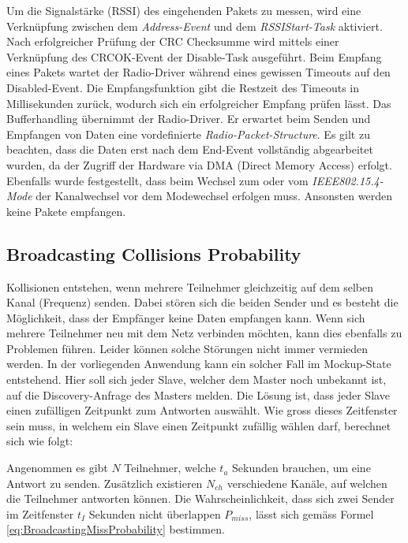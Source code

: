 Um die Signalstärke (RSSI) des eingehenden Pakets zu messen, wird eine Verknüpfung zwischen dem \textit{Address-Event} und dem \textit{RSSIStart-Task} aktiviert.
Nach erfolgreicher Prüfung der CRC Checksumme wird mittels einer Verknüpfung des CRCOK-Event der Disable-Task ausgeführt.
Beim Empfang eines Pakets wartet der Radio-Driver während eines gewissen Timeouts auf den Disabled-Event.
Die Empfangsfunktion gibt die Restzeit des Timeouts in Millisekunden zurück, wodurch sich ein erfolgreicher Empfang prüfen lässt.
Das Bufferhandling übernimmt der Radio-Driver. Er erwartet beim Senden und Empfangen von Daten eine vordefinierte \textit{Radio-Packet-Structure}.
Es gilt zu beachten, dass die Daten erst nach dem End-Event  vollständig abgearbeitet wurden, da der Zugriff der Hardware via DMA (Direct Memory Access) erfolgt.
Ebenfalls wurde festgestellt, dass beim Wechsel zum oder vom  \textit{IEEE802.15.4-Mode} der Kanalwechsel vor dem Modewechsel erfolgen muss. Ansonsten werden keine Pakete empfangen. \cite{nordic_semi_nrf_infocenter_radio_receive_sequence_2020}


\subsection{Broadcasting Collisions Probability}\label{sec:BroadcastingCollissionsProbability}

Kollisionen entstehen, wenn mehrere Teilnehmer gleichzeitig auf dem selben Kanal (Frequenz) senden.
Dabei stören sich die beiden Sender und es besteht die Möglichkeit, dass der Empfänger keine Daten empfangen kann.
Wenn sich mehrere Teilnehmer neu mit dem Netz verbinden möchten, kann dies ebenfalls zu Problemen führen.
Leider können solche Störungen nicht immer vermieden werden.
In der vorliegenden Anwendung kann ein solcher Fall im Mockup-State entstehend.
Hier soll sich jeder Slave, welcher dem Master noch unbekannt ist, auf die Discovery-Anfrage des Masters melden.
Die Lösung ist, dass jeder Slave einen zufälligen Zeitpunkt zum Antworten auswählt.
Wie gross dieses Zeitfenster sein muss, in welchem ein Slave einen Zeitpunkt zufällig wählen darf, berechnet sich wie folgt:

Angenommen es gibt $N$ Teilnehmer, welche $t_a$ Sekunden brauchen, um eine Antwort zu senden.
Zusätzlich existieren $N_{ch}$ verschiedene Kanäle, auf welchen die Teilnehmer antworten können.
Die Wahrscheinlichkeit, dass sich zwei Sender im Zeitfenster $t_I$ Sekunden nicht überlappen $P_{miss}$, lässt sich gemäss Formel \ref{eq:BroadcastingMissProbability} bestimmen. \cite{rk_how_to_deal_with_broadcasting_collision_2020}


